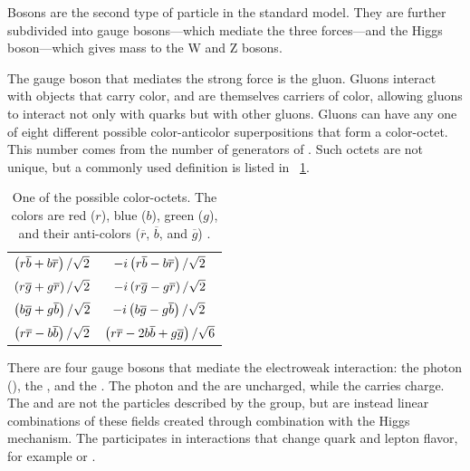 Bosons are the second type of particle in the standard model. They are further
subdivided into gauge bosons---which mediate the three forces---and the Higgs
boson---which gives mass to the W and Z bosons.

The gauge boson that mediates the strong force is the gluon. Gluons interact
with objects that carry color, and are themselves carriers of color, allowing
gluons to interact not only with quarks but with other gluons. Gluons can have
any one of eight different possible color-anticolor superpositions that form a
color-octet. This number comes from the number of generators of \SUthree. Such
octets are not unique, but a commonly used definition is listed in
\TAB~\ref{table:gluon_color}.

\begin{table}[h]
\centering
\begin{center}
    \begin{tabular}{ c  c }
        $\left( r \overline{b} + b \overline{r} \right) / \sqrt{2}$ &
        $-i \left( r \overline{b} - b \overline{r} \right) / \sqrt{2}$ \\
        $\left( r \overline{g} + g \overline{r} \right) / \sqrt{2}$ &
        $-i \left( r \overline{g} - g \overline{r} \right) / \sqrt{2}$ \\
        $\left( b \overline{g} + g \overline{b} \right) / \sqrt{2}$ &
        $-i \left( b \overline{g} - g \overline{b} \right) / \sqrt{2}$ \\
        $\left( r \overline{r} - b \overline{b} \right) / \sqrt{2}$ &
        $\left( r \overline{r} - 2b \overline{b} + g \overline{g} \right) / \sqrt{6}$ \\
    \end{tabular}
    \caption{
        One of the possible color-octets. The colors are red ($r$), blue ($b$),
        green ($g$), and their anti-colors ($\overline{r}$, $\overline{b}$, and
        $\overline{g}$) .
    }
\label{table:gluon_color}
\end{center}
\end{table}

There are four gauge bosons that mediate the electroweak interaction: the photon
(\photon), the \Z, and the \Wpm. The photon and the \Z are uncharged, while the
\Wpm carries charge. The \W and \Z are not the particles described by the
\SUtwoUone group, but are instead linear combinations of these fields created
through combination with the Higgs mechanism. The \W participates in
interactions that change quark and lepton flavor, for example \ttoWb or
\mutoWnu.

